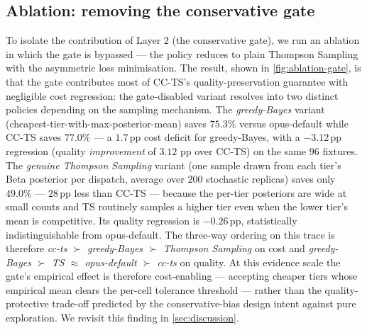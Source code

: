 \subsection{Ablation: removing the conservative gate}

To isolate the contribution of Layer 2 (the conservative gate), we run an
ablation in which the gate is bypassed --- the policy reduces to plain
Thompson Sampling with the asymmetric loss minimisation. The result,
shown in \cref{fig:ablation-gate}, is that the gate contributes most of
CC-TS's quality-preservation guarantee with negligible cost regression: the
gate-disabled variant resolves into two distinct policies depending
on the sampling mechanism. The \emph{greedy-Bayes} variant
(cheapest-tier-with-max-posterior-mean) saves $75.3\%$ versus
opus-default while CC-TS saves $77.0\%$ --- a $1.7\,\mathrm{pp}$
cost deficit for greedy-Bayes, with a $-3.12\,\mathrm{pp}$ regression
(quality \emph{improvement} of $3.12$ pp over CC-TS) on the same
$96$ fixtures. The \emph{genuine Thompson Sampling} variant (one
sample drawn from each tier's Beta posterior per dispatch, average
over $200$ stochastic replicas) saves only $49.0\%$ --- $28\,\mathrm{pp}$
less than CC-TS --- because the per-tier posteriors are wide at
small counts and TS routinely samples a higher tier even when the
lower tier's mean is competitive. Its quality regression is
$-0.26\,\mathrm{pp}$, statistically indistinguishable from
opus-default. The three-way ordering on this trace is therefore
\emph{cc-ts $\succ$ greedy-Bayes $\succ$ Thompson Sampling}
on cost and \emph{greedy-Bayes $\succ$ TS $\approx$ opus-default
$\succ$ cc-ts} on quality.
At this evidence scale the gate's empirical effect is therefore
cost-enabling --- accepting cheaper tiers whose empirical mean clears
the per-cell tolerance threshold --- rather than the
quality-protective trade-off predicted by the conservative-bias design
intent against pure exploration. We revisit this finding in
\cref{sec:discussion}.

